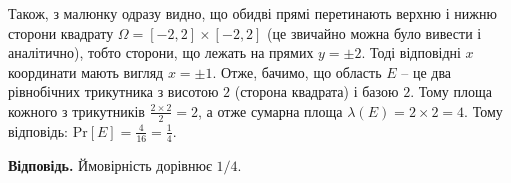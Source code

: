 \documentclass[oneside,solution]{karazin-prob-theory-assign}
\begin{document}
Також, з малюнку одразу видно, що обидві прямі перетинають верхню і нижню сторони квадрату $\Omega = [-2,2] \times [-2,2]$ (це звичайно можна було вивести і аналітично), тобто сторони, що лежать на прямих $y=\pm 2$. Тоді відповідні $x$ координати мають вигляд $x = \pm 1$. Отже, бачимо, що область $E$ -- це два рівнобічних трикутника з висотою $2$ (сторона квадрата) і базою $2$. Тому площа кожного з трикутників $\frac{2 \times 2}{2} = 2$, а отже сумарна площа $\lambda(E) = 2 \times 2 = 4$. Тому відповідь: $\text{Pr}[E] = \frac{4}{16} = \boxed{\frac{1}{4}}$.

\textbf{Відповідь.} Ймовірність дорівнює $1/4$.
\end{document}
